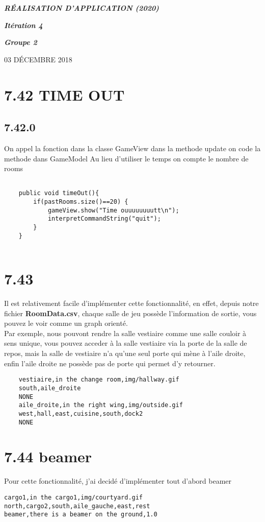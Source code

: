 \documentclass[a4paper , 10pt]{article}
\begin{document}
\begin{center}
\begin{huge}
\textit{\textbf{RÉALISATION D'APPLICATION (2020)}}
\end{huge}
\end{center}
\begin{center}
\begin{LARGE}
\textit{\textbf{Itération 4}}
\end{LARGE}
\end{center}
\textit{}
\textit{}
\begin{center}
\begin{flushleft}
\begin{Large}
\textbf{\textit{Groupe 2}}
\end{Large}
\end{flushleft}
\end{center}
\begin{center}
03 D\'ECEMBRE 2018
\end{center}

\section{7.42 TIME OUT}
\subsection{7.42.0}
On appel la fonction dans la classe GameView  dans la methode update
on code la methode dans GameModel
Au lieu d'utiliser le temps on compte le nombre de rooms
\begin{verbatim}

    public void timeOut(){
        if(pastRooms.size()==20) {
            gameView.show("Time ouuuuuuuutt\n");
            interpretCommandString("quit");
        }
    }
    
\end{verbatim}
\section{7.43}
Il est relativement facile d'implémenter cette fonctionnalité, en effet, depuis notre fichier \textbf{RoomData.csv}, chaque 
salle de jeu possède l'information de sortie, vous pouvez le voir comme un graph orienté.\\
Par exemple, nous pouvont rendre la salle vestiaire comme une salle couloir à sens unique, vous pouvez acceder 
à la salle vestiaire via la porte de la salle de repos, mais la salle de vestiaire n'a qu'une seul porte qui mène à l'aile droite,
enfin l'aile droite ne possède pas de porte qui permet d'y retourner.  
\begin{verbatim}
    vestiaire,in the change room,img/hallway.gif
    south,aile_droite
    NONE
    aile_droite,in the right wing,img/outside.gif
    west,hall,east,cuisine,south,dock2
    NONE
\end{verbatim}

\section{7.44 beamer}
Pour cette fonctionnalité, j'ai decidé d'implémenter tout d'abord beamer 
\begin{verbatim}
cargo1,in the cargo1,img/courtyard.gif
north,cargo2,south,aile_gauche,east,rest
beamer,there is a beamer on the ground,1.0
\end{verbatim}
\end{document}
